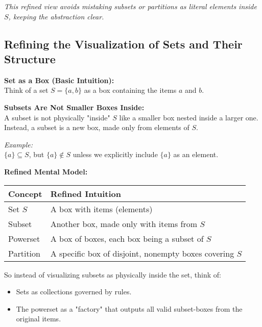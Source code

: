 \documentclass[10pt]{article}
\theoremstyle{plain}
\theoremstyle{definition}
\begin{document}
	\textit{This refined view avoids mistaking subsets or partitions as literal elements inside \( S \), keeping the abstraction clear.}
	
	\subsection*{Refining the Visualization of Sets and Their Structure}
	
	\textbf{Set as a Box (Basic Intuition):} \\
	Think of a set \( S = \{a, b\} \) as a box containing the items \( a \) and \( b \).
	
	\vspace{1em}
	\textbf{Subsets Are Not Smaller Boxes Inside:} \\
	A subset is not physically "inside" \( S \) like a smaller box nested inside a larger one. \\
	Instead, a subset is a new box, made only from elements of \( S \).
	
	\textit{Example:} \\
	\( \{a\} \subseteq S \), but \( \{a\} \notin S \) unless we explicitly include \( \{a\} \) as an element.
	
	\vspace{1em}
	\textbf{Refined Mental Model:}
	
	\begin{center}
		\begin{tabular}{|l|l|}
			\hline
			\textbf{Concept} & \textbf{Refined Intuition} \\
			\hline
			Set \( S \) & A box with items (elements) \\
			Subset     & Another box, made only with items from \( S \) \\
			Powerset   & A box of boxes, each box being a subset of \( S \) \\
			Partition  & A specific box of disjoint, nonempty boxes covering \( S \) \\
			\hline
		\end{tabular}
	\end{center}
	
	\vspace{1em}
	So instead of visualizing subsets as physically inside the set, think of:
	\begin{itemize}
		\item Sets as collections governed by rules.
		\item The powerset as a "factory" that outputs all valid subset-boxes from the original items.
	\end{itemize}
	
\end{document}
